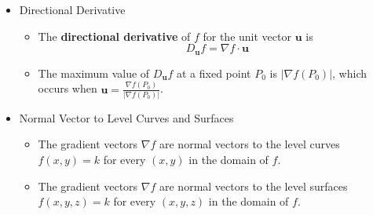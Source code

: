 \documentclass[12pt]{article}
\renewcommand{\vec}[1]{\mathbf{#1}}
\newcommand{\<}{\left<}
\renewcommand{\>}{\right>}
\begin{document}
\begin{itemize}

\item Directional Derivative

  \begin{itemize}
    \item The \textbf{directional derivative} of $f$ for the unit vector $\vec{u}$ is 
      \[ 
        D_{\vec{u}}f = \nabla f \cdot \vec{u}
      \]

    \item The maximum value of $D_{\vec{u}}f$ at a fixed point $P_0$ is $|\nabla f(P_0)|$, which occurs when $\vec{u}=\frac{\nabla f(P_0)}{|\nabla f(P_0)|}$.
  \end{itemize}
  
\item Normal Vector to Level Curves and Surfaces
  \begin{itemize}
    \item The gradient vectors $\nabla f$ are normal vectors to the level curves $f(x,y)=k$ for every $(x,y)$ in the domain of $f$.
    \item The gradient vectors $\nabla f$ are normal vectors to the level surfaces $f(x,y,z)=k$ for every $(x,y,z)$ in the domain of $f$.
  \end{itemize}





\end{itemize}
\end{document}
